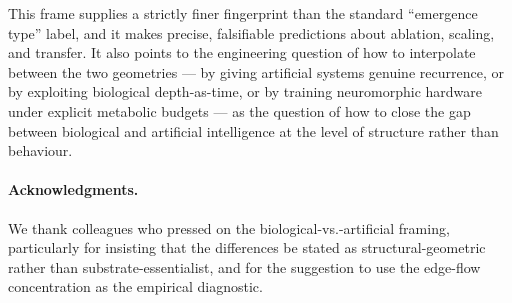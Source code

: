 \documentclass[11pt,a4paper]{article}
\begin{document}
This frame supplies a strictly finer fingerprint than the standard
``emergence type'' label, and it makes precise, falsifiable
predictions about ablation, scaling, and transfer. It also points to
the engineering question of how to interpolate between the two
geometries --- by giving artificial systems genuine recurrence, or by
exploiting biological depth-as-time, or by training neuromorphic
hardware under explicit metabolic budgets --- as the question of how
to close the gap between biological and artificial intelligence at
the level of structure rather than behaviour.

\paragraph{Acknowledgments.} We thank colleagues who pressed on the
biological-vs.-artificial framing, particularly for insisting that
the differences be stated as structural-geometric rather than
substrate-essentialist, and for the suggestion to use the edge-flow
concentration as the empirical diagnostic.
\end{document}
